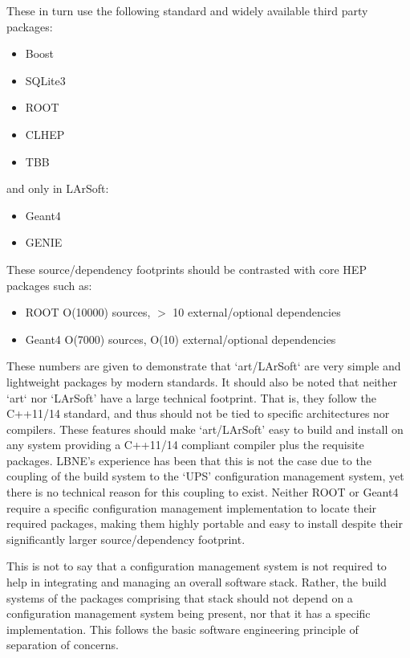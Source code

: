 \documentclass[usletter]{article}
\begin{document}
These in turn use the following standard and widely available third party packages:
\begin{itemize}

	\item Boost
	\item SQLite3
	\item ROOT
	\item CLHEP
	\item TBB

\end{itemize}
and only in LArSoft:

\begin{itemize}

	\item Geant4
	\item GENIE

\end{itemize}

These source/dependency footprints should be contrasted with core HEP
packages such as:

\begin{itemize}

	\item ROOT O(10000) sources, $>$ 10 external/optional dependencies
	\item Geant4 O(7000) sources, O(10) external/optional dependencies

\end{itemize}

These numbers are given to demonstrate that `art/LArSoft` are very simple and
lightweight packages by modern standards. It should also be noted that
neither `art` nor `LArSoft' have a large technical footprint. That is,
they follow the C++11/14 standard, and thus should not be tied to specific
architectures nor compilers.
These features should make `art/LArSoft' easy to build and install on any
system providing a C++11/14 compliant compiler plus the requisite packages.
LBNE's experience has been that this is not the case due to the coupling
of the build system to the `UPS' configuration management system, yet there
is no technical reason for this coupling to exist.
Neither ROOT or Geant4 require a specific configuration management
implementation to locate their required packages, making them highly portable
and easy to install despite their significantly larger source/dependency
footprint.

This is not to say that a configuration management system is not required
to help in integrating and managing an overall software stack.
Rather, the build systems of the packages comprising that stack should not
depend on a configuration management system being present, nor that it has a
specific implementation. This follows the basic software engineering
principle of separation of concerns.
\end{document}
